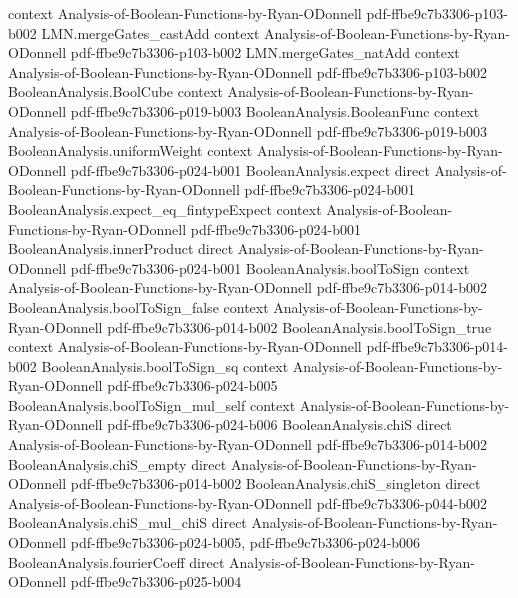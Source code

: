 \begin{theorem}
  {context}
  {Analysis-of-Boolean-Functions-by-Ryan-ODonnell}
  {pdf-ffbe9c7b3306-p103-b002}
\proofstep
  {LMN.mergeGates_castAdd}
  {context}
  {Analysis-of-Boolean-Functions-by-Ryan-ODonnell}
  {pdf-ffbe9c7b3306-p103-b002}
\proofstep
  {LMN.mergeGates_natAdd}
  {context}
  {Analysis-of-Boolean-Functions-by-Ryan-ODonnell}
  {pdf-ffbe9c7b3306-p103-b002}
\proofstep
  {BooleanAnalysis.BoolCube}
  {context}
  {Analysis-of-Boolean-Functions-by-Ryan-ODonnell}
  {pdf-ffbe9c7b3306-p019-b003}
\proofstep
  {BooleanAnalysis.BooleanFunc}
  {context}
  {Analysis-of-Boolean-Functions-by-Ryan-ODonnell}
  {pdf-ffbe9c7b3306-p019-b003}
\proofstep
  {BooleanAnalysis.uniformWeight}
  {context}
  {Analysis-of-Boolean-Functions-by-Ryan-ODonnell}
  {pdf-ffbe9c7b3306-p024-b001}
\proofstep
  {BooleanAnalysis.expect}
  {direct}
  {Analysis-of-Boolean-Functions-by-Ryan-ODonnell}
  {pdf-ffbe9c7b3306-p024-b001}
\proofstep
  {BooleanAnalysis.expect_eq_fintypeExpect}
  {context}
  {Analysis-of-Boolean-Functions-by-Ryan-ODonnell}
  {pdf-ffbe9c7b3306-p024-b001}
\proofstep
  {BooleanAnalysis.innerProduct}
  {direct}
  {Analysis-of-Boolean-Functions-by-Ryan-ODonnell}
  {pdf-ffbe9c7b3306-p024-b001}
\proofstep
  {BooleanAnalysis.boolToSign}
  {context}
  {Analysis-of-Boolean-Functions-by-Ryan-ODonnell}
  {pdf-ffbe9c7b3306-p014-b002}
\proofstep
  {BooleanAnalysis.boolToSign_false}
  {context}
  {Analysis-of-Boolean-Functions-by-Ryan-ODonnell}
  {pdf-ffbe9c7b3306-p014-b002}
\proofstep
  {BooleanAnalysis.boolToSign_true}
  {context}
  {Analysis-of-Boolean-Functions-by-Ryan-ODonnell}
  {pdf-ffbe9c7b3306-p014-b002}
\proofstep
  {BooleanAnalysis.boolToSign_sq}
  {context}
  {Analysis-of-Boolean-Functions-by-Ryan-ODonnell}
  {pdf-ffbe9c7b3306-p024-b005}
\proofstep
  {BooleanAnalysis.boolToSign_mul_self}
  {context}
  {Analysis-of-Boolean-Functions-by-Ryan-ODonnell}
  {pdf-ffbe9c7b3306-p024-b006}
\proofstep
  {BooleanAnalysis.chiS}
  {direct}
  {Analysis-of-Boolean-Functions-by-Ryan-ODonnell}
  {pdf-ffbe9c7b3306-p014-b002}
\proofstep
  {BooleanAnalysis.chiS_empty}
  {direct}
  {Analysis-of-Boolean-Functions-by-Ryan-ODonnell}
  {pdf-ffbe9c7b3306-p014-b002}
\proofstep
  {BooleanAnalysis.chiS_singleton}
  {direct}
  {Analysis-of-Boolean-Functions-by-Ryan-ODonnell}
  {pdf-ffbe9c7b3306-p044-b002}
\proofstep
  {BooleanAnalysis.chiS_mul_chiS}
  {direct}
  {Analysis-of-Boolean-Functions-by-Ryan-ODonnell}
  {pdf-ffbe9c7b3306-p024-b005,
    pdf-ffbe9c7b3306-p024-b006}
\proofstep
  {BooleanAnalysis.fourierCoeff}
  {direct}
  {Analysis-of-Boolean-Functions-by-Ryan-ODonnell}
  {pdf-ffbe9c7b3306-p025-b004}
\proofstep

\end{theorem}
